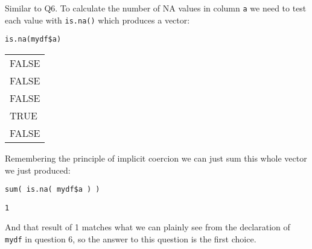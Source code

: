 \documentclass[11pt]{article}
\begin{document}
Similar to Q6.  To calculate the number of NA values in column \texttt{a} we need to test each value with \texttt{is.na()} which produces a vector:

\begin{verbatim}
is.na(mydf$a)
\end{verbatim}

\begin{center}
\begin{tabular}{l}
FALSE\\[0pt]
FALSE\\[0pt]
FALSE\\[0pt]
TRUE\\[0pt]
FALSE\\[0pt]
\end{tabular}
\end{center}

Remembering the principle of implicit coercion we can just sum this whole vector we just produced:

\begin{verbatim}
sum( is.na( mydf$a ) )
\end{verbatim}

\begin{verbatim}
1
\end{verbatim}


And that result of 1 matches what we can plainly see from the declaration of \texttt{mydf} in question 6, so the answer to this question is the first choice.
\end{document}
